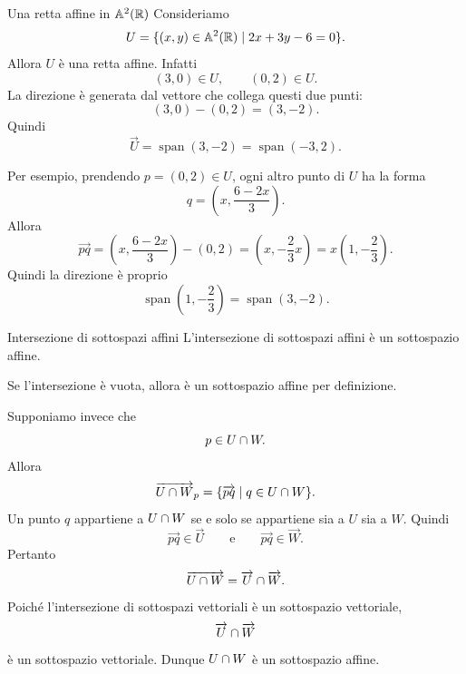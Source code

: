 \documentclass[a4paper]{article}
\begin{document}
\begin{snippetexample}{Una retta affine in \(\mathbb{A}^2(\mathbb{R})\)}
    Consideriamo
    \[
        U=
        \{(x,y)\in\mathbb{A}^2(\mathbb{R})\mid 2x+3y-6=0\}.
    \]
    Allora \(U\) è una retta affine. Infatti
    \[
        (3,0)\in U,
        \qquad
        (0,2)\in U.
    \]
    La direzione è generata dal vettore che collega questi due punti:
    \[
        (3,0)-(0,2)=(3,-2).
    \]
    Quindi
    \[
        \overrightarrow{U}
        =
        \operatorname{span}(3,-2)
        =
        \operatorname{span}(-3,2).
    \]

    Per esempio, prendendo \(p=(0,2)\in U\), ogni altro punto di \(U\) ha la forma
    \[
        q=
        \left(x,\frac{6-2x}{3}\right).
    \]
    Allora
    \[
        \overrightarrow{pq}
        =
        \left(x,\frac{6-2x}{3}\right)-(0,2)
        =
        \left(x,-\frac{2}{3}x\right)
        =
        x\left(1,-\frac{2}{3}\right).
    \]
    Quindi la direzione è proprio
    \[
        \operatorname{span}\left(1,-\frac{2}{3}\right)
        =
        \operatorname{span}(3,-2).
    \]

    \begin{center}
    \end{center}
\end{snippetexample}

\begin{snippetproposition}{Intersezione di sottospazi affini}
    L'intersezione di sottospazi affini è un sottospazio affine.
\end{snippetproposition}

\begin{snippetproof}{}
    Se l'intersezione è vuota, allora è un sottospazio affine per definizione.

    Supponiamo invece che
    \[
        p\in U\cap W.
    \]
    Allora
    \[
        \overrightarrow{U\cap W}_p
        =
        \{\overrightarrow{pq}\mid q\in U\cap W\}.
    \]
    Un punto \(q\) appartiene a \(U\cap W\) se e solo se appartiene sia a \(U\) sia a \(W\). Quindi
    \[
        \overrightarrow{pq}\in\overrightarrow{U}
        \qquad
        \text{e}
        \qquad
        \overrightarrow{pq}\in\overrightarrow{W}.
    \]
    Pertanto
    \[
        \overrightarrow{U\cap W}
        =
        \overrightarrow{U}\cap\overrightarrow{W}.
    \]
    Poiché l'intersezione di sottospazi vettoriali è un sottospazio vettoriale,
    \[
        \overrightarrow{U}\cap\overrightarrow{W}
    \]
    è un sottospazio vettoriale. Dunque \(U\cap W\) è un sottospazio affine.
\end{snippetproof}
\end{document}
